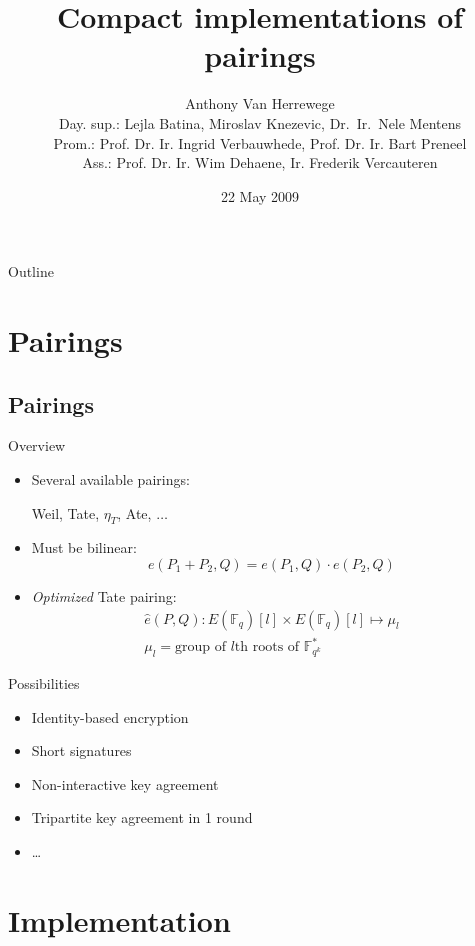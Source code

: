 \documentclass[svgnames]{beamer}
\title{Compact implementations of pairings}
\author[Anthony Van Herrewege]{Anthony Van Herrewege\\[2em]
\footnotesize Day. sup.: Lejla Batina, Miroslav Knezevic, Dr.~Ir.~Nele Mentens\\
Prom.: Prof. Dr. Ir. Ingrid Verbauwhede, Prof. Dr. Ir. Bart Preneel\\
Ass.: Prof. Dr. Ir. Wim Dehaene, Ir. Frederik Vercauteren}
\date{22 May 2009}
\begin{document}
\frame{\titlepage}

\section[Outline]{}
\begin{frame}{Outline}
  \tableofcontents
\end{frame}

\section{Pairings}
\subsection*{Pairings}
\begin{frame}{Overview}
	\begin{itemize}
		\item Several available pairings:
			\begin{center}Weil, \alert{Tate}, $\eta _T$, Ate, $\ldots$\end{center}
		
		\item	Must be bilinear:
			\[ e(P_1 + P_2, Q) = e(P_1, Q) \cdot e(P_2, Q) \]
	
		\item \emph{Optimized} Tate pairing:	
			\[\begin{gathered}
				\hat{e}(P, Q) : E(\mathbb{F}_q)[l] \times E(\mathbb{F}_q)[l] \mapsto \mu _l \\
				\mu _l = \text{group of $l$th roots of } \mathbb{F}_{q^k}^*
			\end{gathered}\]
	\end{itemize}
\end{frame}

\begin{frame}{Possibilities}
	\begin{itemize}
		\item Identity-based encryption
		\item Short signatures
		\item Non-interactive key agreement
		\item Tripartite key agreement in 1 round
		\item \ldots
	\end{itemize}
\end{frame}

\section{Implementation}
\end{document}
